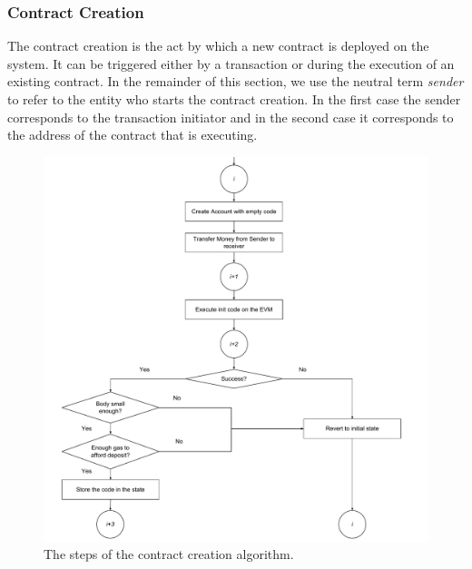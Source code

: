 \subsubsection{Contract Creation}
\label{sec:contract-creation}
The contract creation is the act by which a new contract is deployed on the
system. It can be triggered either by a transaction or during the execution of
an existing contract. In the remainder of this section, we use the neutral term
\textit{sender} to refer to the entity who starts the contract creation. In the
first case the sender corresponds to the transaction initiator and in the
second case it corresponds to the address of the contract that is executing.

\begin{figure}
	\begin{center}
		\includegraphics[width=\textwidth]{./res/img/contract-creation.pdf}
	\end{center}
	\caption{The steps of the contract creation algorithm.}
	\label{fig:contract-creation}
\end{figure}

